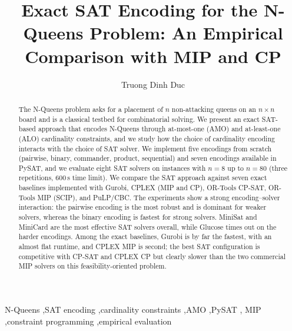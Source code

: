 \documentclass[a4paper,fleqn]{cas-sc}
\begin{document}
\let\WriteBookmarks\relax
\def\floatpagepagefraction{1}
\def\textpagefraction{.001}

\title[mode=title]{Exact SAT Encoding for the N-Queens Problem:\newline
An Empirical Comparison with MIP and CP}

\author[1]{Truong Dinh Duc}


\begin{abstract}
The N-Queens problem asks for a placement of $n$ non-attacking queens on an
$n\times n$ board and is a classical testbed for combinatorial solving. We
present an exact SAT-based approach that encodes N-Queens through
at-most-one (AMO) and at-least-one (ALO) cardinality constraints, and we study
how the choice of cardinality encoding interacts with the choice of SAT solver.
We implement five encodings from scratch (pairwise, binary, commander, product,
sequential) and seven encodings available in PySAT, and we evaluate eight SAT
solvers on instances with $n=8$ up to $n=80$ (three repetitions, 600\,s time
limit). We compare the SAT approach against seven exact baselines implemented
with Gurobi, CPLEX (MIP and CP), OR-Tools CP-SAT, OR-Tools MIP (SCIP), and
PuLP/CBC. The experiments show a strong encoding--solver interaction: the
pairwise encoding is the most robust and is dominant for weaker solvers, whereas
the binary encoding is fastest for strong solvers. MiniSat and MiniCard are the
most effective SAT solvers overall, while Glucose times out on the harder
encodings. Among the exact baselines, Gurobi is by far the fastest, with an
almost flat runtime, and CPLEX MIP is second; the best SAT configuration is
competitive with CP-SAT and CPLEX CP but clearly slower than the two commercial
MIP solvers on this feasibility-oriented problem.
\end{abstract}

\begin{keywords}
N-Queens \sep SAT encoding \sep cardinality constraints \sep AMO \sep PySAT \sep
MIP \sep constraint programming \sep empirical evaluation
\end{keywords}

\maketitle
\end{document}
